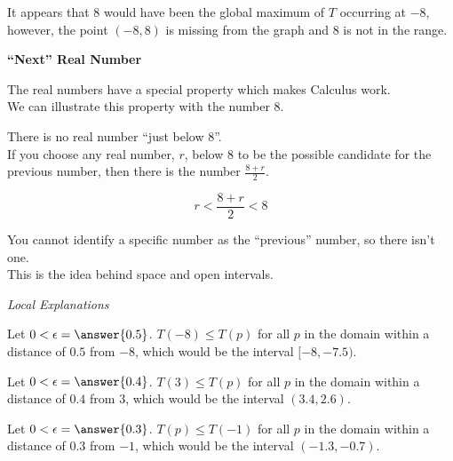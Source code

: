 \documentclass{ximera}
\begin{document}
It appears that $8$ would have been the global maximum of $T$ occurring at $-8$, however, the point $(-8, 8)$ is missing from the graph and $8$ is not in the range.  



\begin{idea}  \textbf{\textcolor{blue!55!black}{``Next'' Real Number}}


The real numbers have a special property which makes Calculus work. \\

We can illustrate this property with the number $8$. \\

\begin{explanation}

There is no real number ``just below $8$''.  \\


If you choose any real number, $r$, below $8$ to be the possible candidate for the previous number, then there is the number $\frac{8+r}{2}$. 

\[  
r < \frac{8+r}{2} < 8
\]  

You cannot identify a specific number as the ``previous'' number, so there isn't one. \\

This is the idea behind space and open intervals.


\end{explanation}

\end{idea}



\begin{explanation} \textit{Local Explanations}


Let $0 < \epsilon = \answer{0.5}$.  $T(-8) \leq T(p)$ for all $p$ in the domain within a distance of $0.5$ from $-8$, which would be the interval $[-8, -7.5)$.

Let $0 < \epsilon = \answer{0.4}$.  $T(3) \leq T(p)$ for all $p$ in the domain within a distance of $0.4$ from $3$, which would be the interval $(3.4, 2.6)$.

Let $0 < \epsilon = \answer{0.3}$.  $T(p) \leq T(-1)$ for all $p$ in the domain within a distance of $0.3$ from $-1$, which would be the interval $(-1.3, -0.7)$.

\end{explanation}
\end{document}
